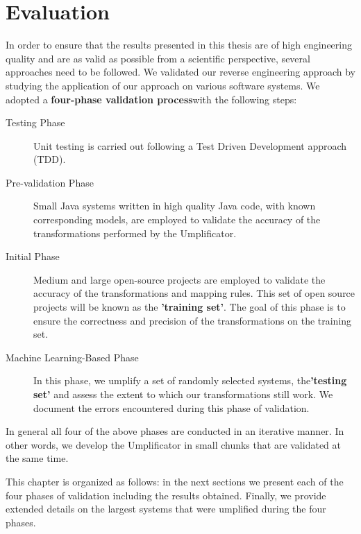 \lhead{\emph{\leftmark}}  %
\chapter{Evaluation}
\label{chap:evaluation}
In order to ensure that the results presented in this thesis are of high engineering quality and are as valid as possible from a scientific perspective, several approaches need to be followed. We validated our reverse engineering approach  by studying the application of our approach on various software systems. We adopted a \textbf{four-phase validation process}with the following steps:

\begin{description}

\item[Testing Phase]
Unit testing is carried out following a Test Driven Development approach (TDD).

\item[Pre-validation Phase]
Small Java systems written in high quality Java code, with known corresponding models, are employed to validate the accuracy of the transformations performed by the Umplificator.

\item[Initial Phase]
Medium and large  open-source projects are employed to validate the accuracy of the transformations and mapping rules. This set of open source projects will be known as the \textbf{'training set'}. The goal of this phase is to ensure the correctness and precision of the transformations on the training set.

\item[Machine Learning-Based Phase]
In this phase, we umplify a set of randomly selected systems, the\textbf{'testing set'} and assess the extent to which our transformations still work. We document the errors encountered during this phase of validation.

\end{description}

In general all four of the above phases are conducted in an iterative manner. In other words, we develop the Umplificator in small chunks that are validated at the same time.

This chapter is organized as follows: in the next sections we present each of the four phases of validation including the results obtained.  Finally, we provide extended details on the largest systems that were umplified during the four phases. 

